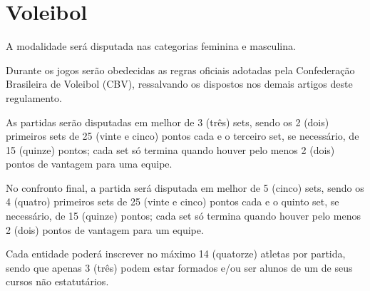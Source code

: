 {\let\clearpage\relax \chapter{Voleibol}}

\begin{article}
	A modalidade será disputada nas categorias feminina e masculina.
\end{article}

\begin{article}
	Durante os jogos serão obedecidas as regras oficiais adotadas pela Confederação Brasileira de Voleibol (CBV), ressalvando os dispostos nos demais artigos deste regulamento.
\end{article}

\begin{article}
	As partidas serão disputadas em melhor de 3 (três) sets, sendo os 2 (dois) primeiros sets de 25 (vinte e cinco) pontos cada e o terceiro set, se necessário, de 15 (quinze) pontos; cada set só termina quando houver pelo menos 2 (dois) pontos de vantagem para uma equipe.

	\begin{xparagraph}
		No confronto final, a partida será disputada em melhor de 5 (cinco) sets, sendo os 4 (quatro) primeiros sets de 25 (vinte e cinco) pontos cada e o quinto set, se necessário, de 15 (quinze) pontos; cada set só termina quando houver pelo menos 2 (dois) pontos de vantagem para um equipe.
	\end{xparagraph}
\end{article}

\begin{article}
	Cada entidade poderá inscrever no máximo 14 (quatorze) atletas por partida, sendo que apenas 3 (três) podem estar formados e/ou ser alunos de um de seus cursos não estatutários.
\end{article}
